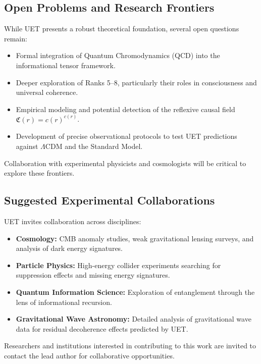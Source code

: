 \documentclass[12pt,a4paper]{article}
\begin{document}
\subsection{Open Problems and Research Frontiers}

While UET presents a robust theoretical foundation, several open questions remain:

\begin{itemize}
    \item Formal integration of Quantum Chromodynamics (QCD) into the informational tensor framework.
    \item Deeper exploration of Ranks 5–8, particularly their roles in consciousness and universal coherence.
    \item Empirical modeling and potential detection of the reflexive causal field \(\mathfrak{C}(r) = c(r)^{c(r)}\).
    \item Development of precise observational protocols to test UET predictions against \(\Lambda\)CDM and the Standard Model.
\end{itemize}

Collaboration with experimental physicists and cosmologists will be critical to explore these frontiers.

\subsection{Suggested Experimental Collaborations}

UET invites collaboration across disciplines:

\begin{itemize}
    \item \textbf{Cosmology:} CMB anomaly studies, weak gravitational lensing surveys, and analysis of dark energy signatures.
    \item \textbf{Particle Physics:} High-energy collider experiments searching for suppression effects and missing energy signatures.
    \item \textbf{Quantum Information Science:} Exploration of entanglement through the lens of informational recursion.
    \item \textbf{Gravitational Wave Astronomy:} Detailed analysis of gravitational wave data for residual decoherence effects predicted by UET.
\end{itemize}

Researchers and institutions interested in contributing to this work are invited to contact the lead author for collaborative opportunities.
\end{document}
